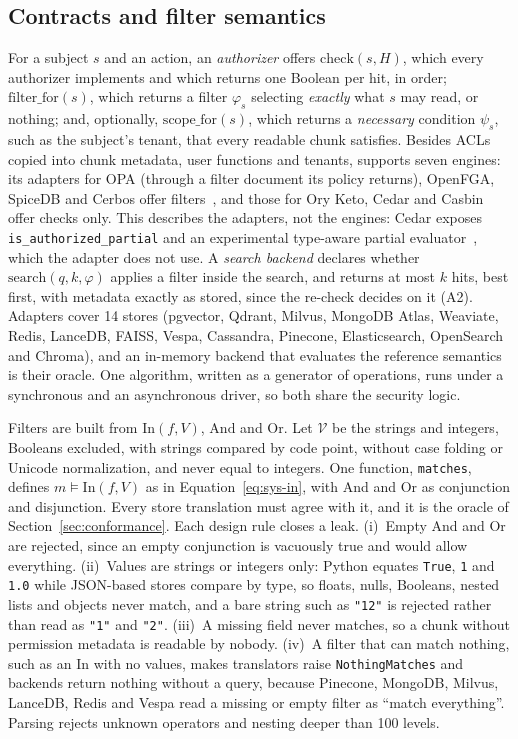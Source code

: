 \subsection{Contracts and filter semantics}\label{sec:sys-contracts}

For a subject $s$ and an action, an \emph{authorizer} offers $\mathrm{check}(s,H)$, which every
authorizer implements and which returns one Boolean per hit, in order; $\mathrm{filter\_for}(s)$,
which returns a filter $\varphi_s$ selecting \emph{exactly} what $s$ may read, or nothing; and,
optionally, $\mathrm{scope\_for}(s)$, which returns a \emph{necessary} condition $\psi_s$, such as
the subject's tenant, that every readable chunk satisfies. Besides ACLs copied into chunk metadata,
user functions and tenants, \sys{} supports seven engines: its adapters for OPA (through a filter document its policy
returns), OpenFGA, SpiceDB and Cerbos offer
filters~\cite{openfga2026perform,authzed2026protecting,cerbos2026cerbos}, and those for Ory Keto, Cedar and
Casbin offer checks only. This describes the adapters, not the engines: Cedar exposes \texttt{is\_authorized\_partial} and an experimental type-aware partial evaluator~\cite{cedar2026cedarpolicy}, which the adapter does not use. A \emph{search backend} declares whether
$\mathrm{search}(q,k,\varphi)$ applies a filter inside the search, and returns at most $k$ hits,
best first, with metadata exactly as stored, since the re-check decides on it (A2). Adapters cover
14 stores (pgvector, Qdrant, Milvus, MongoDB Atlas, Weaviate, Redis, LanceDB, FAISS, Vespa,
Cassandra, Pinecone, Elasticsearch, OpenSearch and Chroma), and an in-memory backend that evaluates
the reference semantics is their oracle. One algorithm, written as a generator of operations, runs
under a synchronous and an asynchronous driver, so both share the security logic.

Filters are built from $\mathrm{In}(f,V)$, $\mathrm{And}$ and $\mathrm{Or}$. Let $\mathcal{V}$ be the
strings and integers, Booleans excluded, with strings compared by code point, without case folding
or Unicode normalization, and never equal to integers. One function, \texttt{matches}, defines
$m \models \mathrm{In}(f,V)$ as in Equation~\ref{eq:sys-in}, with And and Or as conjunction and
disjunction. Every store translation must agree with it, and it is the oracle of
Section~\ref{sec:conformance}. Each design rule closes a leak. (i)~Empty And and Or
are rejected, since an empty conjunction is vacuously true and would allow everything.
(ii)~Values are strings or integers only: Python equates \texttt{True}, \texttt{1} and \texttt{1.0}
while JSON-based stores compare by type, so floats, nulls, Booleans, nested lists and objects never
match, and a bare string such as \texttt{"12"} is rejected rather than read as \texttt{"1"} and
\texttt{"2"}. (iii)~A missing field never matches, so a chunk without permission metadata is readable
by nobody. (iv)~A filter that can match nothing, such as an In with no values, makes translators
raise \texttt{NothingMatches} and backends return nothing without a query, because Pinecone,
MongoDB, Milvus, LanceDB, Redis and Vespa read a missing or empty filter as ``match everything''.
Parsing rejects unknown operators and nesting deeper than 100 levels.

